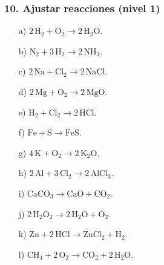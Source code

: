 \subsubsection*{10. Ajustar reacciones (nivel 1)}
\begin{enumerate}
    \item[a)] $2\,\mathrm{H_2}+\mathrm{O_2}\rightarrow2\,\mathrm{H_2O}$.
    \item[b)] $\mathrm{N_2}+3\,\mathrm{H_2}\rightarrow2\,\mathrm{NH_3}$.
    \item[c)] $2\,\mathrm{Na}+\mathrm{Cl_2}\rightarrow2\,\mathrm{NaCl}$.
    \item[d)] $2\,\mathrm{Mg}+\mathrm{O_2}\rightarrow2\,\mathrm{MgO}$.
    \item[e)] $\mathrm{H_2}+\mathrm{Cl_2}\rightarrow2\,\mathrm{HCl}$.
    \item[f)] $\mathrm{Fe}+\mathrm{S}\rightarrow\mathrm{FeS}$.
    \item[g)] $4\,\mathrm{K}+\mathrm{O_2}\rightarrow2\,\mathrm{K_2O}$.
    \item[h)] $2\,\mathrm{Al}+3\,\mathrm{Cl_2}\rightarrow2\,\mathrm{AlCl_3}$.
    \item[i)] $\mathrm{CaCO_3}\rightarrow\mathrm{CaO}+\mathrm{CO_2}$.
    \item[j)] $2\,\mathrm{H_2O_2}\rightarrow2\,\mathrm{H_2O}+\mathrm{O_2}$.
    \item[k)] $\mathrm{Zn}+2\,\mathrm{HCl}\rightarrow
    \mathrm{ZnCl_2}+\mathrm{H_2}$.
    \item[l)] $\mathrm{CH_4}+2\,\mathrm{O_2}\rightarrow
    \mathrm{CO_2}+2\,\mathrm{H_2O}$.
\end{enumerate}

